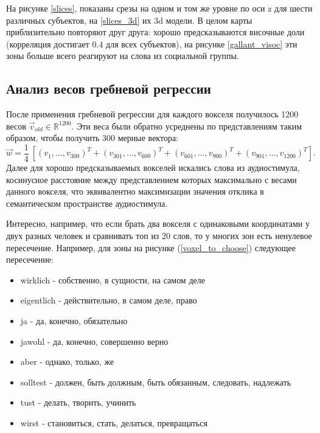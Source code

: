 \documentclass[pdftex,ptm,12pt,a4paper]{report}
\theoremstyle{definition}
\begin{document}
На рисунке \ref{slices},  показаны срезы на одном и том же уровне по оси z  для шести различных субъектов, на \ref{slices_3d} их 3d модели. В целом карты приблизительно повторяют друг друга: хорошо предсказываются височные доли (корреляция достигает 0.4 для всех субъектов), на рисунке \ref{gallant_visoc} эти зоны больше всего реагируют на слова из социальной группы.


\subsection{Анализ весов гребневой регрессии}
После применения гребневой регрессии для каждого вокселя получилось 1200 весов $\vec{v}_{old} \in \mathbb{R}^{1200}$. Эти веса были обратно усреднены по представлениям таким образом, чтобы получить 300 мерные вектора:
$$\vec{w} = \frac{1}{4}\ [(v_1, \ldots, v_{300})^{T} + (v_{301}, \ldots, v_{600})^{T} + (v_{601}, \ldots, v_{900})^{T} + (v_{901}, \ldots, v_{1200})^{T}].$$
Далее для хорошо предсказываемых вокселей искались слова из аудиостимула, косинусное расстояние между представлением которых максимально с весами данного вокселя, что эквивалентно максимизации значения отклика в семантическом пространстве аудиостимула.

Интересно, например, что если брать два вокселя с одинаковыми координатами у двух разных человек и сравнивать топ из 20 слов, то у многих зон есть ненулевое пересечение. Например, для зоны на рисунке (\ref{voxel_to_choose}) следующее  пересечение:

\begin{itemize}
\item wirklich - собственно, в сущности, на самом деле
\item eigentlich - действительно, в самом деле, право
\item ja - да, конечно, обязательно
\item jawohl -  да, конечно, совершенно верно
\item aber - однако, только, же
\item solltest - должен, быть должным, быть обязанным, следовать, надлежать
\item tust - делать, творить, учинить
\item wirst - становиться, стать, делаться, превращаться
\end{itemize}
\end{document}
